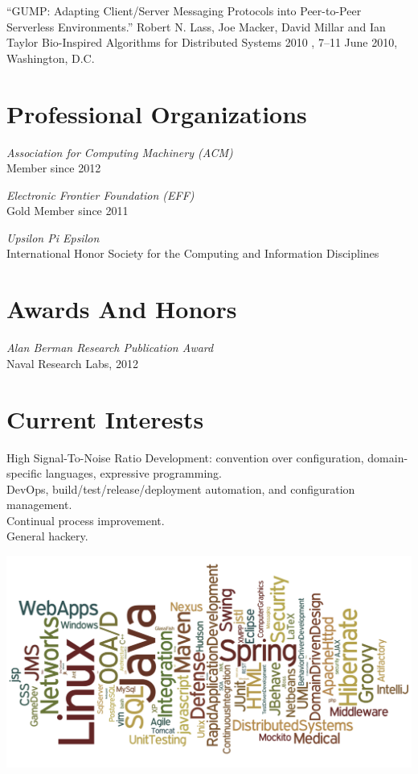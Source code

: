 \documentclass[margin]{res}
\begin{document}
\begin{resume}
  ``GUMP: Adapting Client/Server Messaging Protocols into Peer-to-Peer Serverless Environments.'' Robert N. Lass, Joe Macker, David Millar and Ian Taylor Bio-Inspired Algorithms for Distributed Systems 2010 , 7--11 June 2010, Washington, D.C.

\section{Professional Organizations}
  {\it Association for Computing Machinery (ACM)} \\
  Member since 2012

  {\it Electronic Frontier Foundation (EFF)} \\
  Gold Member since 2011

  {\it Upsilon Pi Epsilon} \\
  International Honor Society for the Computing and Information Disciplines

\section{Awards And Honors}
  {\it Alan Berman Research Publication Award} \\
  Naval Research Labs, 2012

\section{Current Interests}
  High Signal-To-Noise Ratio Development: convention over configuration, domain-specific languages, expressive programming. \\
  DevOps, build/test/release/deployment automation, and configuration management. \\
  Continual process improvement. \\
  General hackery.

\end{resume}

\includegraphics[scale=0.30]{word_cloud3.pdf}

\end{document}
